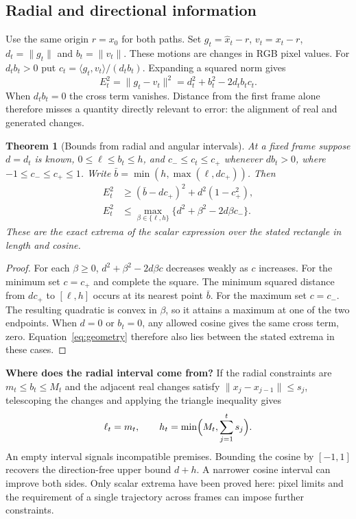 \documentclass[11pt]{article}
\theoremstyle{noteplain}
\newtheorem{theorem}{Theorem}
\newcommand{\norm}[1]{\lVert #1\rVert}
\newcommand{\ip}[2]{\langle #1,#2\rangle}
\begin{document}
\subsection{Radial and directional information}
Use the same origin $r=x_0$ for both paths. Set $g_t=\widehat x_t-r$, $v_t=x_t-r$, $d_t=\norm{g_t}$ and $b_t=\norm{v_t}$. These motions are changes in RGB pixel values. For $d_tb_t>0$ put $c_t=\ip{g_t}{v_t}/(d_tb_t)$. Expanding a squared norm gives
\begin{equation}
 E_t^2=\norm{g_t-v_t}^2=d_t^2+b_t^2-2d_tb_tc_t . \label{eq:geometry}
\end{equation}
When $d_tb_t=0$ the cross term vanishes. Distance from the first frame alone therefore misses a quantity directly relevant to error: the alignment of real and generated changes.

\begin{theorem}[Bounds from radial and angular intervals]\label{thm:geometry}
At a fixed frame suppose $d=d_t$ is known, $0\le\ell\le b_t\le h$, and $c_-\le c_t\le c_+$ whenever $db_t>0$, where $-1\le c_-\le c_+\le1$. Write $\bar b=\min(h,\max(\ell,dc_+))$. Then
\begin{align}
 E_t^2 &\ge (\bar b-dc_+)^2+d^2(1-c_+^2), \label{eq:min}\\
 E_t^2 &\le \max_{\beta\in\{\ell,h\}}\{d^2+\beta^2-2d\beta c_-\}. \label{eq:max}
\end{align}
These are the exact extrema of the scalar expression over the stated rectangle in length and cosine.
\end{theorem}
\begin{proof}
For each $\beta\ge0$, $d^2+\beta^2-2d\beta c$ decreases weakly as $c$ increases. For the minimum set $c=c_+$ and complete the square. The minimum squared distance from $dc_+$ to $[\ell,h]$ occurs at its nearest point $\bar b$. For the maximum set $c=c_-$. The resulting quadratic is convex in $\beta$, so it attains a maximum at one of the two endpoints. When $d=0$ or $b_t=0$, any allowed cosine gives the same cross term, zero. Equation~\eqref{eq:geometry} therefore also lies between the stated extrema in these cases.
\end{proof}

\textbf{Where does the radial interval come from?} If the radial constraints are $m_t\le b_t\le M_t$ and the adjacent real changes satisfy $\norm{x_j-x_{j-1}}\le s_j$, telescoping the changes and applying the triangle inequality gives
\[
  \ell_t=m_t,\qquad h_t=\min\Bigl(M_t,\sum_{j=1}^t s_j\Bigr).
\]
An empty interval signals incompatible premises. Bounding the cosine by $[-1,1]$ recovers the direction-free upper bound $d+h$. A narrower cosine interval can improve both sides. Only scalar extrema have been proved here: pixel limits and the requirement of a single trajectory across frames can impose further constraints.
\end{document}
